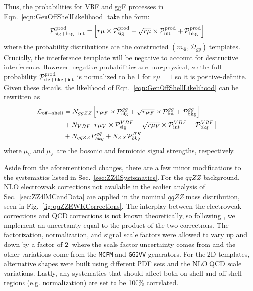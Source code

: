 Thus, the probabilities for VBF and ggF processes in Eqn.~\ref{eqn:GenOffShellLikelihood} take the form:
\begin{equation}
\mathcal{P}_{\rm sig+bkg+int}^{\rm prod} = \left[r\mu\times\mathcal{P}_{\rm sig}^{\rm prod} + \sqrt{r\mu}\times\mathcal{P}_{\rm int}^{\rm prod} + \mathcal{P}_{\rm bkg}^{\rm prod} \right]
\end{equation}
where the probability distributions are the constructed $(m_{4l},\mathcal{D}_{gg})$ templates. Crucially, the interference template will be negative to account for destructive interference. However, negative probabilities are non-physical, so the full probability $\mathcal{P}_{\rm sig+bkg+int}^{\rm prod}$ is normalized to be 1 for $r\mu=1$ so it is positive-definite. Given these details, the likelihood of Eqn.~\ref{eqn:GenOffShellLikelihood} can be rewritten as
\begin{equation}
\begin{split}
\mathcal{L}_{\rm off-shell} &= N_{ggZZ}\left[r\mu_{F}\times\mathcal{P}_{\rm sig}^{gg} + \sqrt{r\mu_{F}}\times\mathcal{P}_{\rm int}^{gg} + \mathcal{P}_{\rm bkg}^{gg}\right] \\
&+ N_{VBF}\left[r\mu_{V}\times\mathcal{P}_{\rm sig}^{VBF} + \sqrt{r\mu_{V}}\times\mathcal{P}_{\rm int}^{VBF} + \mathcal{P}_{\rm bkg}^{VBF}\right] \\
&+ N_{q\bar{q}ZZ}P_{bkg}^{q\bar{q}} + N_{ZX}\mathcal{P}_{bkg}^{ZX}
\end{split}
\end{equation}
where $\mu_V$ and $\mu_F$ are the bosonic and fermionic signal strengths, respectively.

Aside from the aforementioned changes, there are a few minor modifications to the systematics listed in Sec.~\ref{sec:ZZ4lSystematics}. For the $q\bar{q}ZZ$ background, NLO electroweak corrections \cite{} not available in the earlier analysis of Sec.~\ref{sec:ZZ4lMCandData} are applied in the nominal $q\bar{q}ZZ$ mass distribution, seen in Fig.~\ref{fig:qqZZEWKCorrections}. The interplay between the electroweak corrections and QCD corrections is not known theoretically, so following \cite{}, we implement an uncertainty equal to the product of the two corrections. The factorization, normalization, and signal scale factors were allowed to vary up and down by a factor of 2, where the scale factor uncertainty comes from \cite{} and the other variations come from the {\tt MCFM} and {\tt GG2VV} generators. For the 2D templates, alternative shapes were built using different PDF sets and the NLO QCD scale variations. Lastly, any systematics that should affect both on-shell and off-shell regions (e.g. normalization) are set to be 100\% correlated.

